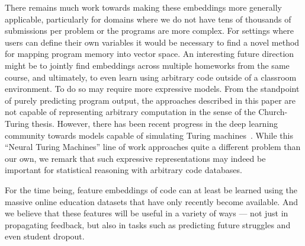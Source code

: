 There remains much work towards making these embeddings more 
generally applicable, particularly for domains where we do not have
tens of thousands of submissions per problem or the programs are more complex. For settings where users can define their own variables it would be necessary to find a novel method for mapping program memory into vector space. An interesting
future direction might be to jointly find embeddings across multiple homeworks from the same course, and ultimately, to 
even learn  using arbitrary code outside of a classroom environment. To do so may require more expressive models. From the standpoint  of purely predicting  program output, the approaches described in this paper are not capable of representing arbitrary computation in the 
sense of the Church-Turing thesis.  However,
there has been recent progress in the deep learning community
towards models capable of simulating Turing machines~\cite{graves2014neural}. 
While this  ``Neural Turing Machines'' 
line of work approaches quite a different problem
than our own, we remark that such expressive
representations may indeed be important for statistical
reasoning with arbitrary code databases.


For the time being, 
feature embeddings of code can at least be learned using
the massive online education
datasets that have only recently
become available.  And we believe that these features will
be useful in a variety of ways --- not just in propagating 
feedback, but also in tasks such as  predicting future struggles and even student dropout.






